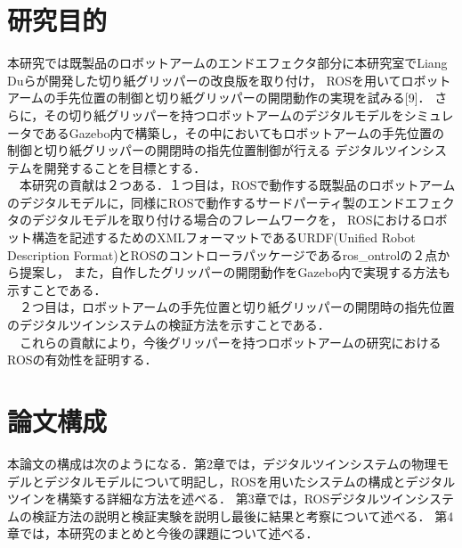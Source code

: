 \section{研究目的}
本研究では既製品のロボットアームのエンドエフェクタ部分に本研究室でLiang Duらが開発した切り紙グリッパーの改良版を取り付け，
ROSを用いてロボットアームの手先位置の制御と切り紙グリッパーの開閉動作の実現を試みる[9]．
さらに，その切り紙グリッパーを持つロボットアームのデジタルモデルをシミュレータであるGazebo内で構築し，その中においてもロボットアームの手先位置の制御と切り紙グリッパーの開閉時の指先位置制御が行える
デジタルツインシステムを開発することを目標とする．\\
　本研究の貢献は２つある．１つ目は，ROSで動作する既製品のロボットアームのデジタルモデルに，同様にROSで動作するサードパーティ製のエンドエフェクタのデジタルモデルを取り付ける場合のフレームワークを，
ROSにおけるロボット構造を記述するためのXMLフォーマットであるURDF(Unified Robot Description Format)とROSのコントローラパッケージであるros\_ontrolの２点から提案し，
また，自作したグリッパーの開閉動作をGazebo内で実現する方法も示すことである．\\
　２つ目は，ロボットアームの手先位置と切り紙グリッパーの開閉時の指先位置のデジタルツインシステムの検証方法を示すことである．\\
　これらの貢献により，今後グリッパーを持つロボットアームの研究におけるROSの有効性を証明する．


\section{論文構成}
本論文の構成は次のようになる．第2章では，デジタルツインシステムの物理モデルとデジタルモデルについて明記し，ROSを用いたシステムの構成とデジタルツインを構築する詳細な方法を述べる．
第3章では，ROSデジタルツインシステムの検証方法の説明と検証実験を説明し最後に結果と考察について述べる．
第4章では，本研究のまとめと今後の課題について述べる．
